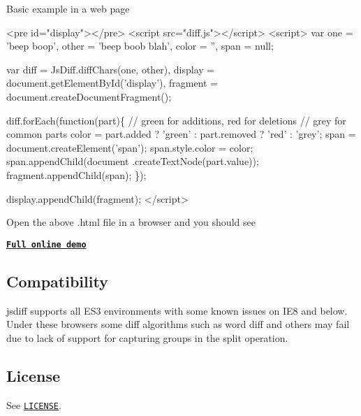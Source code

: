 Basic example in a web page


\begin{DoxyCode}
<pre id="display"></pre>
<script src="diff.js"></script>
<script>
var one = 'beep boop',
    other = 'beep boob blah',
    color = '',
    span = null;

var diff = JsDiff.diffChars(one, other),
    display = document.getElementById('display'),
    fragment = document.createDocumentFragment();

diff.forEach(function(part)\{
  // green for additions, red for deletions
  // grey for common parts
  color = part.added ? 'green' :
    part.removed ? 'red' : 'grey';
  span = document.createElement('span');
  span.style.color = color;
  span.appendChild(document
    .createTextNode(part.value));
  fragment.appendChild(span);
\});

display.appendChild(fragment);
</script>
\end{DoxyCode}


Open the above .html file in a browser and you should see



{\bfseries \href{http://kpdecker.github.com/jsdiff}{\tt Full online demo}}

\subsection*{Compatibility}

\href{https://saucelabs.com/u/jsdiff}{\tt }

jsdiff supports all E\+S3 environments with some known issues on I\+E8 and below. Under these browsers some diff algorithms such as word diff and others may fail due to lack of support for capturing groups in the {\ttfamily split} operation.

\subsection*{License}

See \href{https://github.com/kpdecker/jsdiff/blob/master/LICENSE}{\tt L\+I\+C\+E\+N\+SE}. 